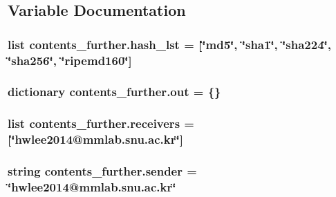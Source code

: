 \subsection{Variable Documentation}
\hypertarget{namespacecontents__further_a1ff7ba576b1dcc906cd0fedc610d5ae8}{
\subsubsection[{hash\-\_\-lst}]{\setlength{\rightskip}{0pt plus 5cm}list contents\-\_\-further.\-hash\-\_\-lst = \mbox{[}\char`\"{}md5\char`\"{}, \char`\"{}sha1\char`\"{}, \char`\"{}sha224\char`\"{}, \char`\"{}sha256\char`\"{}, \char`\"{}ripemd160\char`\"{}\mbox{]}}}\label{namespacecontents__further_a1ff7ba576b1dcc906cd0fedc610d5ae8}
\hypertarget{namespacecontents__further_a3535cdabeeec1dd45ec8ae4082ecccb6}{
\subsubsection[{out}]{\setlength{\rightskip}{0pt plus 5cm}dictionary contents\-\_\-further.\-out = \{\}}}\label{namespacecontents__further_a3535cdabeeec1dd45ec8ae4082ecccb6}
\hypertarget{namespacecontents__further_a646b167511af908b54ec28b31bb848b0}{
\subsubsection[{receivers}]{\setlength{\rightskip}{0pt plus 5cm}list contents\-\_\-further.\-receivers = \mbox{[}\char`\"{}hwlee2014@mmlab.\-snu.\-ac.\-kr\char`\"{}\mbox{]}}}\label{namespacecontents__further_a646b167511af908b54ec28b31bb848b0}
\hypertarget{namespacecontents__further_a7480f74ed6ccf0d04f96c73db969bbdb}{
\subsubsection[{sender}]{\setlength{\rightskip}{0pt plus 5cm}string contents\-\_\-further.\-sender = \char`\"{}hwlee2014@mmlab.\-snu.\-ac.\-kr\char`\"{}}}\label{namespacecontents__further_a7480f74ed6ccf0d04f96c73db969bbdb}
